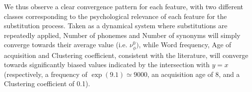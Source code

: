 
\medskip
We thus observe a clear convergence pattern for each feature, with two different classes corresponding to the psychological relevance of each feature for the substitution process.
Taken as a dynamical system where substitutions are repeatedly applied, Number of phonemes and Number of synonyms will simply converge towards their average value (i.e. $\nu_{\phi}^0)$, while Word frequency, Age of acquisition and Clustering coefficient, consistent with the literature, will converge towards significantly biased values indicated by the intersection with $y = x$ (respectively, a frequency of $\exp(9.1) \simeq 9000$, an acquisition age of 8, and a Clustering coefficient of 0.1).


